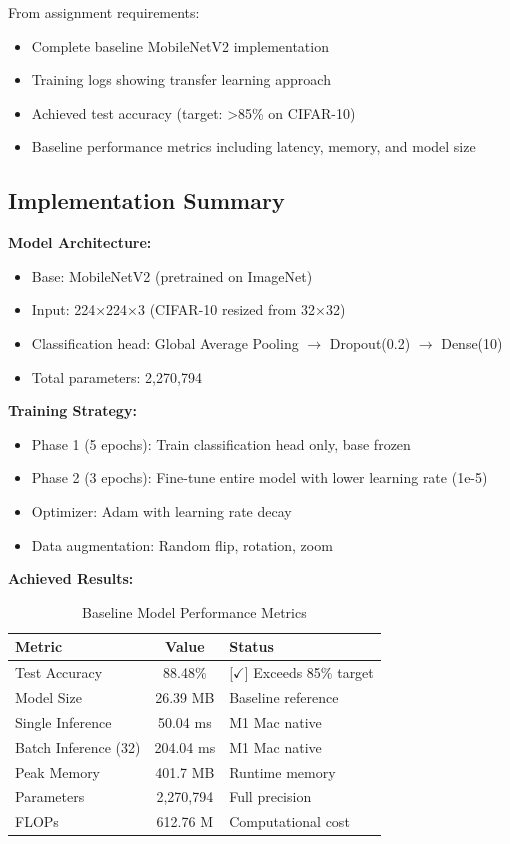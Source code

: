 \documentclass[10pt, a4paper]{article}
\begin{document}
From assignment requirements:
\begin{itemize}
    \item Complete baseline MobileNetV2 implementation
    \item Training logs showing transfer learning approach
    \item Achieved test accuracy (target: >85\% on CIFAR-10)
    \item Baseline performance metrics including latency, memory, and model size
\end{itemize}

\subsection{Implementation Summary}

\textbf{Model Architecture:}
\begin{itemize}
    \item Base: MobileNetV2 (pretrained on ImageNet)
    \item Input: 224×224×3 (CIFAR-10 resized from 32×32)
    \item Classification head: Global Average Pooling $\rightarrow$ Dropout(0.2) $\rightarrow$ Dense(10)
    \item Total parameters: 2,270,794
\end{itemize}

\textbf{Training Strategy:}
\begin{itemize}
    \item Phase 1 (5 epochs): Train classification head only, base frozen
    \item Phase 2 (3 epochs): Fine-tune entire model with lower learning rate (1e-5)
    \item Optimizer: Adam with learning rate decay
    \item Data augmentation: Random flip, rotation, zoom
\end{itemize}

\textbf{Achieved Results:}

\begin{table}[H]
\centering
\footnotesize
\begin{tabular}{|l|c|l|}
\hline
\textbf{Metric} & \textbf{Value} & \textbf{Status} \\
\hline
Test Accuracy & 88.48\% & [$\checkmark$] Exceeds 85\% target \\
Model Size & 26.39 MB & Baseline reference \\
Single Inference & 50.04 ms & M1 Mac native \\
Batch Inference (32) & 204.04 ms & M1 Mac native \\
Peak Memory & 401.7 MB & Runtime memory \\
Parameters & 2,270,794 & Full precision \\
FLOPs & 612.76 M & Computational cost \\
\hline
\end{tabular}
\caption{Baseline Model Performance Metrics}
\end{table}
\end{document}
